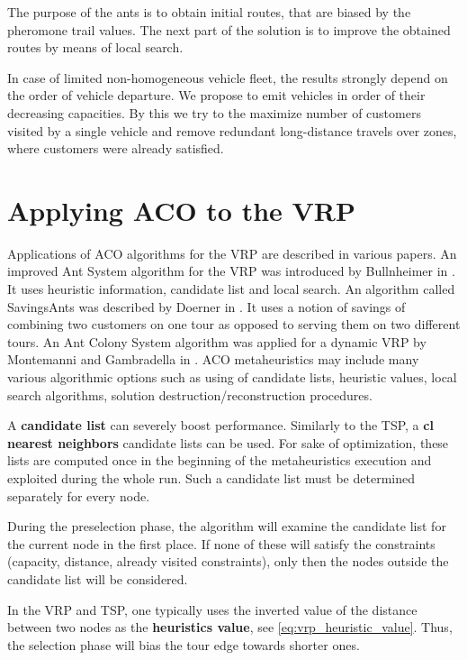 \documentclass[12pt,a4paper,oneside]{book}
\begin{document}
The purpose of the ants is to obtain initial routes, that are biased by the pheromone trail values. The next part of the solution is to improve the obtained routes by means of local search.

In case of limited non-homogeneous vehicle fleet, the results strongly depend on the order of vehicle departure. We propose to emit vehicles in order of their decreasing capacities. By this we try to the maximize number of customers visited by a single vehicle and remove redundant long-distance travels over zones, where customers were already satisfied.

\section{Applying ACO to the VRP}

Applications of ACO algorithms for the VRP are described in various papers. An improved Ant System algorithm for the VRP was introduced by Bullnheimer in \cite{DBLP:journals/anor/BullnheimerHS99}. It uses heuristic information, candidate list and local search. An algorithm called SavingsAnts was described by Doerner in \cite{10.1007/3-540-46004-7_2}. It uses a notion of savings of combining two customers on one tour as opposed to serving them on two different tours. An Ant Colony System algorithm was applied for a dynamic VRP by Montemanni and Gambradella in \cite{MontemanniR.2005ACSf}. ACO metaheuristics may include many various algorithmic options such as using of candidate lists, heuristic values, local search algorithms, solution destruction/reconstruction procedures.

A \textbf{candidate list} can severely boost performance. Similarly to the TSP, a \textbf{cl nearest neighbors} candidate lists can be used. For sake of optimization, these lists are computed once in the beginning of the metaheuristics execution and exploited during the whole run. Such a candidate list must be determined separately for every node.

During the preselection phase, the algorithm will examine the candidate list for the current node in the first place. If none of these will satisfy the constraints (capacity, distance, already visited constraints), only then the nodes outside the candidate list will be considered.

In the VRP and TSP, one typically uses the inverted value of the distance between two nodes as the \textbf{heuristics value}, see \eqref{eq:vrp_heuristic_value}. Thus, the selection phase will bias the tour edge towards shorter ones.
\end{document}

